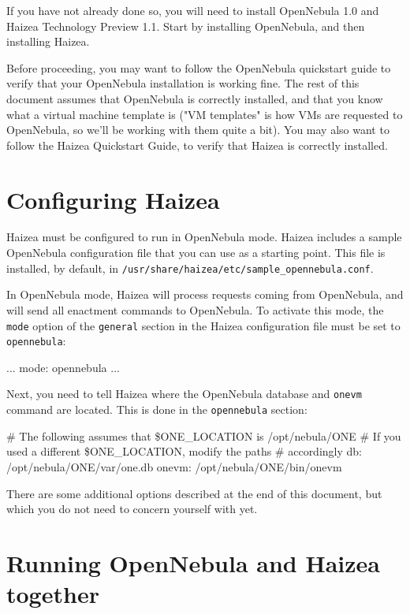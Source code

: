 If you have not already done so, you will need to install OpenNebula 1.0 and Haizea Technology Preview 1.1. Start by installing OpenNebula, and then installing Haizea.

Before proceeding, you may want to follow the OpenNebula quickstart guide to verify that your OpenNebula installation is working fine. The rest of this document assumes that OpenNebula is correctly installed, and that you know what a virtual machine template is ("VM templates" is how VMs are requested to OpenNebula, so we'll be working with them quite a bit). You may also want to follow the Haizea Quickstart Guide, to verify that Haizea is correctly installed.

\section{Configuring Haizea}

Haizea must be configured to run in OpenNebula mode. Haizea includes a sample OpenNebula configuration file that you can use as a starting point. This file is installed, by default, in \texttt{/usr/share/haizea/etc/sample\_opennebula.conf}.

In OpenNebula mode, Haizea will process requests coming from OpenNebula, and will send all enactment commands to OpenNebula. To activate this mode, the \texttt{mode} option of the \texttt{general} section in the Haizea configuration file must be set to \texttt{opennebula}:

\begin{wideshellverbatim}
[general]
...
mode: opennebula
...
\end{wideshellverbatim}

Next, you need to tell Haizea where the OpenNebula database and \texttt{onevm} command are located. This is done in the \texttt{opennebula} section:

\begin{wideshellverbatim}
[opennebula]
# The following assumes that \$ONE_LOCATION is /opt/nebula/ONE
# If you used a different \$ONE_LOCATION, modify the paths 
# accordingly
db: /opt/nebula/ONE/var/one.db
onevm: /opt/nebula/ONE/bin/onevm
\end{wideshellverbatim}

There are some additional options described at the end of this document, but which you do not need to concern yourself with yet.

\section{Running OpenNebula and Haizea together}

